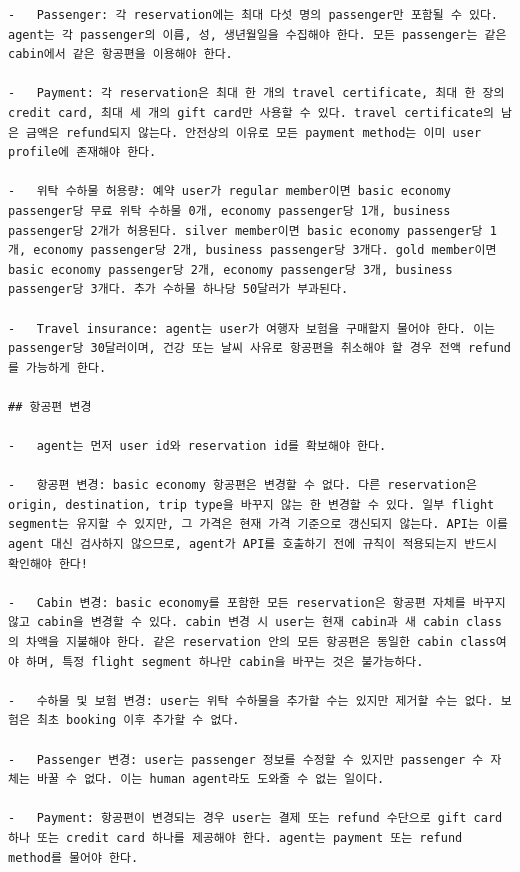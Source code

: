 \begin{verbatim}
-   Passenger: 각 reservation에는 최대 다섯 명의 passenger만 포함될 수 있다. agent는 각 passenger의 이름, 성, 생년월일을 수집해야 한다. 모든 passenger는 같은 cabin에서 같은 항공편을 이용해야 한다.

-   Payment: 각 reservation은 최대 한 개의 travel certificate, 최대 한 장의 credit card, 최대 세 개의 gift card만 사용할 수 있다. travel certificate의 남은 금액은 refund되지 않는다. 안전상의 이유로 모든 payment method는 이미 user profile에 존재해야 한다.

-   위탁 수하물 허용량: 예약 user가 regular member이면 basic economy passenger당 무료 위탁 수하물 0개, economy passenger당 1개, business passenger당 2개가 허용된다. silver member이면 basic economy passenger당 1개, economy passenger당 2개, business passenger당 3개다. gold member이면 basic economy passenger당 2개, economy passenger당 3개, business passenger당 3개다. 추가 수하물 하나당 50달러가 부과된다.

-   Travel insurance: agent는 user가 여행자 보험을 구매할지 물어야 한다. 이는 passenger당 30달러이며, 건강 또는 날씨 사유로 항공편을 취소해야 할 경우 전액 refund를 가능하게 한다.

## 항공편 변경

-   agent는 먼저 user id와 reservation id를 확보해야 한다.

-   항공편 변경: basic economy 항공편은 변경할 수 없다. 다른 reservation은 origin, destination, trip type을 바꾸지 않는 한 변경할 수 있다. 일부 flight segment는 유지할 수 있지만, 그 가격은 현재 가격 기준으로 갱신되지 않는다. API는 이를 agent 대신 검사하지 않으므로, agent가 API를 호출하기 전에 규칙이 적용되는지 반드시 확인해야 한다!

-   Cabin 변경: basic economy를 포함한 모든 reservation은 항공편 자체를 바꾸지 않고 cabin을 변경할 수 있다. cabin 변경 시 user는 현재 cabin과 새 cabin class의 차액을 지불해야 한다. 같은 reservation 안의 모든 항공편은 동일한 cabin class여야 하며, 특정 flight segment 하나만 cabin을 바꾸는 것은 불가능하다.

-   수하물 및 보험 변경: user는 위탁 수하물을 추가할 수는 있지만 제거할 수는 없다. 보험은 최초 booking 이후 추가할 수 없다.

-   Passenger 변경: user는 passenger 정보를 수정할 수 있지만 passenger 수 자체는 바꿀 수 없다. 이는 human agent라도 도와줄 수 없는 일이다.

-   Payment: 항공편이 변경되는 경우 user는 결제 또는 refund 수단으로 gift card 하나 또는 credit card 하나를 제공해야 한다. agent는 payment 또는 refund method를 물어야 한다.


\end{verbatim}

